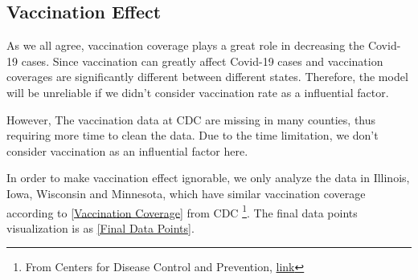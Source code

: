 \documentclass{article}
\begin{document}
\subsection{Vaccination Effect}
As we all agree, vaccination coverage plays a great role in decreasing the Covid-19 cases. Since vaccination can greatly affect Covid-19 cases and vaccination coverages are significantly different between different states. Therefore, the model will be unreliable if we didn't consider vaccination rate as a influential factor.

However, The vaccination data at CDC are missing in many counties, thus requiring more time to clean the data. Due to the time limitation, we don't consider vaccination as an influential factor here.

In order to make vaccination effect ignorable, we only analyze the data in Illinois, Iowa, Wisconsin and Minnesota, which have similar vaccination coverage according to \cref{Vaccination Coverage} from CDC
\footnote{From Centers for Disease Control and Prevention, \href{https://covid.cdc.gov/covid-data-tracker}{link}}. The final data points visualization is as \cref{Final Data Points}.
\end{document}
